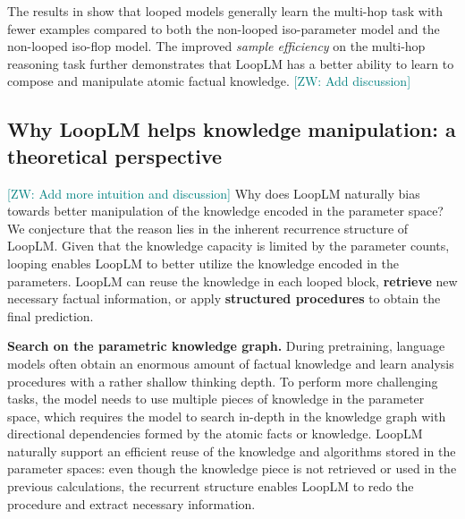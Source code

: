 \documentclass[]{bytedance_seed}
\newcommand{\1}{\mathbf{1}}
\newcommand{\ut}{LoopLM}
\newcommand{\zixuan}[1]{\textcolor{teal}{[ZW: #1]}}
\begin{document}
The results in  show that looped models generally learn the multi-hop task with fewer examples compared to both the non-looped iso-parameter model and the non-looped iso-flop model. The improved \textit{sample efficiency} on the multi-hop reasoning task further demonstrates that \ut{} has a better ability to learn to compose and manipulate atomic factual knowledge. \zixuan{Add discussion}

\subsection{Why \ut{} helps knowledge manipulation: a theoretical perspective}
\label{subsec:theory_and_discussion}
\zixuan{Add more intuition and discussion}
Why does \ut{} naturally bias towards better manipulation of the knowledge encoded in the parameter space? We conjecture that the reason lies in the inherent recurrence structure of \ut{}. Given that the knowledge capacity is limited by the parameter counts, looping enables \ut{} to better utilize the knowledge encoded in the parameters.
\ut{} can reuse the knowledge in each looped block, \textbf{retrieve} new necessary factual information, or apply \textbf{structured procedures} to obtain the final prediction.

\textbf{Search on the parametric knowledge graph.} During pretraining, language models often obtain an enormous amount of factual knowledge and learn analysis procedures with a rather shallow thinking depth. To perform more challenging tasks, the model needs to use multiple pieces of knowledge in the parameter space, which requires the model to search in-depth in the knowledge graph with directional dependencies formed by the atomic facts or knowledge. \ut{} naturally support an efficient reuse of the knowledge and algorithms stored in the parameter spaces: even though the knowledge piece is not retrieved or used in the previous calculations, the recurrent structure enables \ut{} to redo the procedure and extract necessary information.
\end{document}
